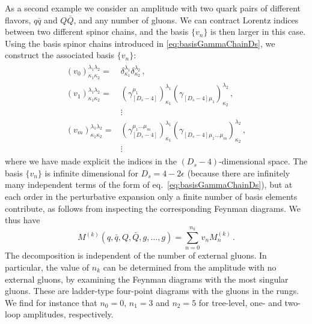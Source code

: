 As a second example we consider an amplitude with two quark pairs of 
different flavors, $q\bar q$ and $Q\bar Q$, and any number of
gluons. We can contract Lorentz indices between two 
different spinor chains, and the basis 
$\{v_n\}$ is then larger in this case. Using the basis spinor chains introduced in 
\cref{eq:basisGammaChainDs}, we construct the associated
basis $\{v_n\}$:
\begin{align}
  \begin{split} \label{eqn:4qtensors}
    (v_0)_{\kappa_1\kappa_2}^{\lambda_1\lambda_2}   = &
    \delta_{\kappa_1}^{\lambda_1} \delta_{\kappa_2}^{\lambda_2}\,, \\
    (v_1)_{\kappa_1\kappa_2}^{\lambda_1\lambda_2}=
    &(\gamma_{[D_s-4]}^{\mu_1} )_{\kappa_1}^{\lambda_1} 
    (\gamma_{[D_s-4]\mu_1}^{\phantom{\mu}})_{\kappa_2}^{\lambda_2}\,, \\
    & \vdots\\
    (v_m)_{\kappa_1\kappa_2}^{\lambda_1\lambda_2}=
    &(\gamma_{[D_s-4]}^{\mu_1 \ldots  \mu_m})_{\kappa_1}^{\lambda_1}
    (\gamma_{[D_s-4]\mu_1 \ldots \mu_m}^{\phantom{\mu}})_{\kappa_2}^{\lambda_2}\,,\\
    & \vdots\,
  \end{split}
\end{align}
where we have made explicit the indices in the $
(D_s-4)$-dimensional space.
The basis $\{v_n\}$ is infinite dimensional for
$D_s=4-2\epsilon$ (because there are infinitely many independent
terms of the form of eq.~\eqref{eq:basisGammaChainDs}), but at
each order in the perturbative
expansion only a finite number of basis elements contribute, 
as follows from inspecting the corresponding Feynman diagrams.
We thus have
\begin{equation} \label{eqn:4qampltensor}
	M^{(k)} (q,\bar q,Q,\bar Q,g,\ldots,g) =\sum_{n=0}^{n_k} v_n M^{(k)}_n\,.
\end{equation}
The decomposition is independent of the number
of external gluons. In particular,
the value of $n_k$ can be determined from the amplitude with no 
external gluons, by examining the Feynman diagrams
with the most singular gluons. 
These are ladder-type four-point diagrams with the 
gluons in the rungs. We find for instance that $n_0=0$,
$n_1=3$ and $n_2=5$ for tree-level, one- and two-loop
amplitudes, respectively.

